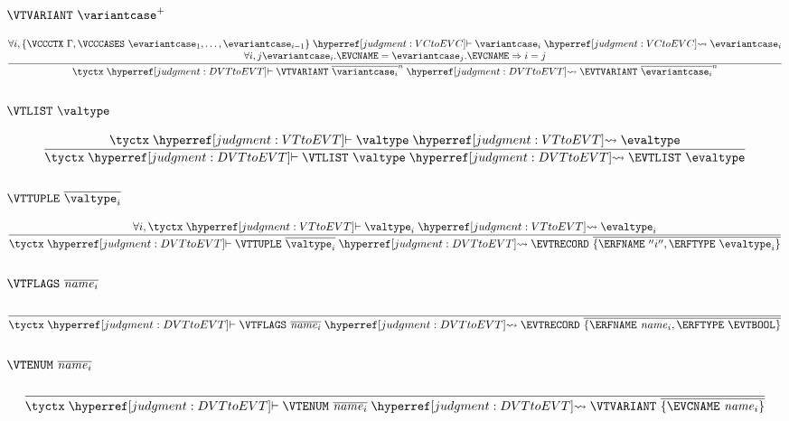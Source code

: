 \subsubsection{$\VTVARIANT~\variantcase^{+}$}

\[
  \frac{
    \begin{array}{@{}c@{}}
    \forall i, \{ \VCCCTX~\Gamma, \VCCCASES~{\evariantcase}_1,\dots,{\evariantcase}_{i-1} \}  \vdashh!VCtoEVC! \variantcase_i \leadstoh!VCtoEVC! {\evariantcase}_i\\
    \forall i, j {\evariantcase}_i.\EVCNAME = {\evariantcase}_j.\EVCNAME \Rightarrow i = j
    \end{array}
  }{
    \tyctx \vdashh!DVTtoEVT! \VTVARIANT~\overline{\variantcase_i}^n
    \leadstoh!DVTtoEVT! \EVTVARIANT~\overline{{\evariantcase}_i}^n
  }
\]

\subsubsection{$\VTLIST~\valtype$}
\[
  \frac{
    \tyctx \vdashh!VTtoEVT! \valtype \leadstoh!VTtoEVT! \evaltype
  }{
    \tyctx \vdashh!DVTtoEVT! \VTLIST~\valtype \leadstoh!DVTtoEVT! \EVTLIST~\evaltype
  }
\]

\subsubsection{$\VTTUPLE~\overline{\valtype_i}$}
\[
  \frac{
    \forall i, \tyctx \vdashh!VTtoEVT! \valtype_i \leadstoh!VTtoEVT! {\evaltype}_i
  }{
    \tyctx \vdashh!DVTtoEVT! \VTTUPLE~\overline{\valtype_i}
    \leadstoh!DVTtoEVT! \EVTRECORD~\overline{\{\ERFNAME~''i'',\ERFTYPE~{\evaltype}_i\}}
  }
\]

\subsubsection{$\VTFLAGS~\overline{\name_i}$}
\[
  \frac{
  }{
    \tyctx \vdashh!DVTtoEVT! \VTFLAGS~\overline{\name_i}
    \leadstoh!DVTtoEVT! \EVTRECORD~\overline{\{\ERFNAME~\name_i, \ERFTYPE~\EVTBOOL\}}
  }
\]

\subsubsection{$\VTENUM~\overline{\name_i}$}

\[
  \frac{
  }{
    \tyctx \vdashh!DVTtoEVT! \VTENUM~\overline{\name_i}
    \leadstoh!DVTtoEVT! \VTVARIANT~\overline{\{\EVCNAME~\name_i\}}
  }
\]

